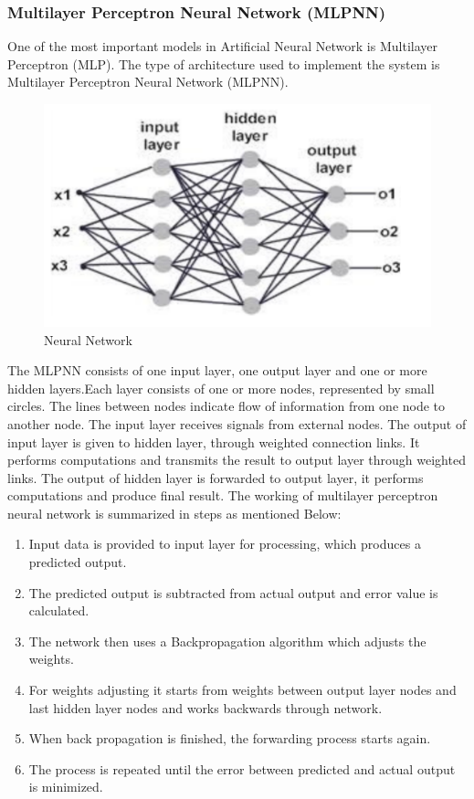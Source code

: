 \documentclass[oneside,12pt]{Classes/VTU}
\begin{document}
  		\subsubsection{Multilayer Perceptron Neural Network (MLPNN)}
  		One of the most important models in Artificial Neural Network is Multilayer Perceptron
  		(MLP). The  type of architecture  used to  implement  the system  is Multilayer Perceptron Neural Network (MLPNN).
  		\begin{figure}[H]
  			\begin{center}
  				\includegraphics[width=12cm]{images/mlpnn.png}
  				\caption{Neural Network}
  			\end{center}
  		\end{figure}
  		The MLPNN consists of one input layer, one output layer and one or more hidden layers.Each layer consists of one or more nodes, represented by small circles. The lines between nodes indicate flow of information from one node to another node. The input layer receives signals from external nodes. The output of input layer is given to hidden layer, through weighted connection links. It performs computations and transmits the result to output layer through weighted links. The output of hidden layer is forwarded to output layer, it performs computations and produce final result. The working of multilayer perceptron neural network is summarized in steps as mentioned
  		Below:
  		\begin{enumerate}
  			\item Input data  is provided to input layer for processing, which  produces a
  			predicted output.
  			\item The predicted output is subtracted from actual output and error value is
  			calculated.
  			\item  The network then  uses a  Backpropagation algorithm  which  adjusts the
  			weights.
  			\item For weights adjusting it starts from weights between output layer nodes
  			and last hidden layer nodes and works backwards through network.
  			\item When back propagation is finished, the forwarding process starts again.
  			\item The process is repeated until the error between predicted and actual output
  			is minimized.
  		\end{enumerate}
  	\pagebreak
  	
\end{document}
